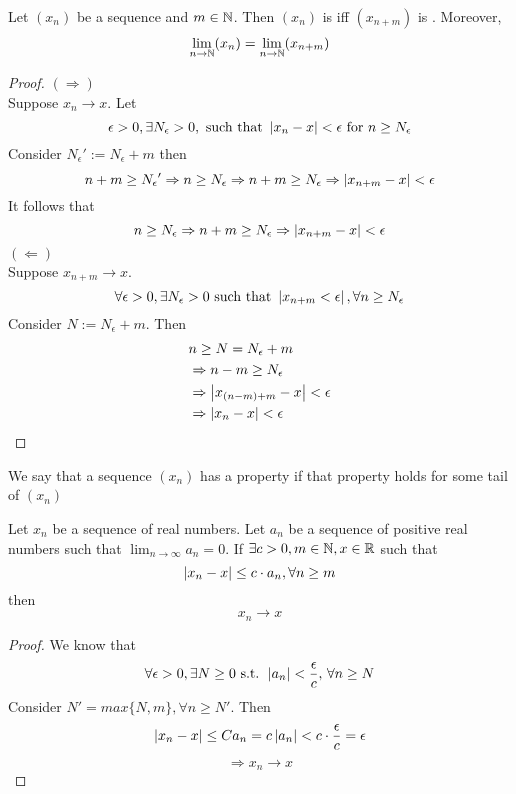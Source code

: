 \documentclass[a4paper,12pt]{article}
\begin{document}
\begin{theorem}
    Let \((x_n)\) be a sequence and \(m\in\mathbb{N}\). Then \((x_n)\) is  iff \((x_{n+m})\) is . 
    Moreover,\[\lim_{n\to\mathbb{N}}(x_n) = \lim_{n\to\mathbb{N}}(x_{n+m})\]
\end{theorem}

\begin{proof}
    \((\Rightarrow)\)\\
    Suppose \(x_n\to x\). Let\[\epsilon>0, \exists N_\epsilon >0, \text{ such that } \left\lvert x_n-x\right\rvert<\epsilon \text{ for }n\ge N_\epsilon\]
    Consider \({N_\epsilon}':=N_\epsilon + m\) then
    \[n+m \ge {N_\epsilon}' \Rightarrow n\ge N_\epsilon \Rightarrow n+m\ge N_\epsilon \Rightarrow \left\lvert x_{n+m}-x\right\rvert<\epsilon\]
    It follows that \[n\ge N_\epsilon \Rightarrow n+m \ge N_\epsilon \Rightarrow \left\lvert x_{n+m}-x\right\rvert<\epsilon\]
    \newpage
    \((\Leftarrow)\)\\
    Suppose \(x_{n+m}\rightarrow x\).
    \[\forall \epsilon>0,\exists N_\epsilon>0 \text{ such that } \left\lvert x_{n+m}<\epsilon\right\rvert, \forall n\ge N_\epsilon\]
    Consider \(N:=N_\epsilon+m\). Then 
    \begin{align*}
        & n\ge N = N_\epsilon+m \\
        & \Rightarrow n-m \ge N_\epsilon \\
        & \Rightarrow\left\lvert x_{(n-m)+m}-x\right\rvert<\epsilon \\
        & \Rightarrow\left\lvert x_n-x\right\rvert<\epsilon
    \end{align*}
\end{proof}

\begin{remark}
    We say that a sequence \((x_n)\)  has a property if that property holds for some tail of \((x_n)\)\\
\end{remark}

\begin{theorem}
    Let \(x_n\) be a sequence of real numbers. 
    Let \(a_n\) be a sequence of positive real numbers such that \(\lim_{n\to \infty}a_n=0\).
    If \(\exists c>0, m\in \mathbb{N}, x\in \mathbb{R}\) such that \[\left\lvert x_n-x\right\rvert \le c\cdot a_n,\forall n\ge m\]
    then \[x_n\to x\]
\end{theorem}

\begin{proof}
    We know that
    \[\forall \epsilon>0, \exists N\ge 0\text{ s.t. } \left\lvert a_n\right\rvert<\frac{\epsilon}{c},\, \forall n\ge N\]
    Consider \(N'=max\{N,m\}, \forall n\ge N'\). Then 
    \[\left\lvert x_n-x\right\rvert\le Ca_n = c\left\lvert a_n\right\rvert<c\cdot\frac{\epsilon}{c} = \epsilon\]
    \[\Rightarrow x_n\rightarrow x\]
\end{proof}
\end{document}
